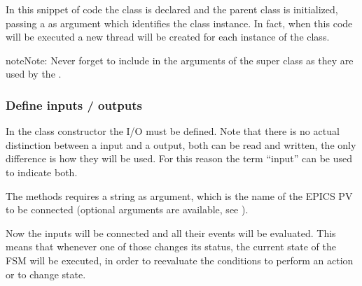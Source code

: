 \documentclass[letterpaper,10pt,english]{sphinxmanual}
\begin{document}
In this snippet of code the class is declared and the parent class is
initialized, passing a  as argument which identifies the
class instance. In fact, when this code will be executed a new thread
will be created for each instance of the class.

\begin{sphinxadmonition}{note}{Note:}
Never forget to include  in the arguments of the super class as they are used by the {\hyperref[\detokenize{loader:loader}]{}}.
\end{sphinxadmonition}


\subsubsection{Define inputs / outputs}
\label{\detokenize{overview:define-inputs-outputs}}
In the class constructor the I/O must be defined. Note that there is
no actual distinction between a input and a output, both can be read
and written, the only difference is how they will be used. For this
reason the term “input” can be used to indicate both.

%
\begin{sphinxVerbatim}[commandchars=\\\{\}]
  
  
  
\end{sphinxVerbatim}

The {\hyperref[\detokenize{fsm:connect}]{}} methods requires a string as argument, which is
the name of the EPICS PV to be connected (optional arguments are
available, see {\hyperref[\detokenize{io:accessing-io}]{}}).

Now the inputs will be connected and all their events will be evaluated.
This means that whenever one of those changes its status, the current
state of the FSM will be executed, in order to reevaluate the
conditions to perform an action or to change state.
\end{document}
